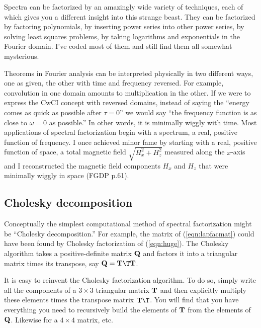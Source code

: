 \par
Spectra can be factorized by an amazingly wide variety of techniques,
each of which gives you a different insight into this strange beast.
They can be factorized by factoring polynomials, by inserting power series
into other power series, by solving least squares problems,
by taking logarithms and exponentials in the Fourier domain.
I've coded most of them and still find them all somewhat mysterious.

\par
Theorems in Fourier analysis can be interpreted physically in two
different ways, one as given, the other with time and frequency reversed.
For example, convolution in one domain amounts to multiplication in the other.
If we were to express the CwCI concept with reversed domains,
instead of saying the ``energy comes as quick as possible after $\tau=0$''
we would say ``the frequency function is as close to $\omega=0$ as possible.''
In other words, it is minimally wiggly with time.
Most applications of spectral factorization begin with a spectrum,
a real, positive function of frequency.
I once achieved minor fame by starting with a real, positive function of space,
a total magnetic field $\sqrt{H_x^2 +H_z^2}$ measured along the $x$-axis
and I reconstructed the magnetic field components $H_x$ and $H_z$
that were minimally wiggly in space (FGDP p.61).






\subsection{Cholesky decomposition}
Conceptually the simplest computational method of spectral factorization
might be ``Cholesky decomposition.''
For example, the matrix of (\ref{eqn:lapfacmat})
could have been found by Cholesky factorization of (\ref{eqn:huge}).
The Cholesky algorithm takes a positive-definite matrix
$\bold Q$ and factors it into a triangular matrix
times its transpose,
say $\bold Q = \bold T\T \bold T$.

\par
It is easy to reinvent the Cholesky factorization algorithm.
To do so,
simply write all the components of a $3\times 3$ triangular matrix
$\bold T$ and then explicitly multiply these elements
times the transpose matrix $\bold T\T$.
You will find that you have everything you need
to recursively build the elements of $\bold T$
from the elements of $\bold Q$.
Likewise for a $4\times 4$ matrix, etc.

